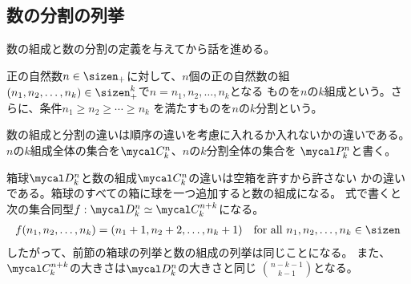 \subsection{数の分割の列挙}\label{s2:数の分割の列挙} %
	数の組成と数の分割の定義を与えてから話を進める。
	\begin{definition}[数の組成と列挙]\label{def:数の組成と列挙} %
		正の自然数$n\in\sizen_+$に対して、$n$個の正の自然数の組
		$(n_1,n_2,\dots,n_k)\in\sizen_+^k$で$n=n_1,n_2,\dots,n_k$となる
		ものを$n$の$k$組成という。さらに、条件$n_1\ge n_2\ge\cdots\ge n_k$
		を満たすものを$n$の$k$分割という。
	\end{definition} %
	数の組成と分割の違いは順序の違いを考慮に入れるか入れないかの違いである。
	$n$の$k$組成全体の集合を$\sosei_k^n$、$n$の$k$分割全体の集合を
	$\bunkatu_k^n$と書く。

	箱球$\hakodama_k^n$と数の組成$\sosei_k^n$の違いは空箱を許すから許さない
	かの違いである。箱球のすべての箱に球を一つ追加すると数の組成になる。
	式で書くと次の集合同型$f: \hakodama_k^n\simeq\sosei_k^{n+k}$になる。
	\begin{equation*}\begin{split} %
		f(n_1,n_2,\dots,n_k) = (n_1+1,n_2+2,\dots,n_k+1)
		\quad\text{for all }n_1,n_2,\dots,n_k\in\sizen
	\end{split}\end{equation*} %
	したがって、前節の箱球の列挙と数の組成の列挙は同じことになる。
	また、$\sosei_k^{n+k}$の大きさは$\hakodama_k^n$の大きさと同じ
	$\binom{n-k-1}{k-1}$となる。


